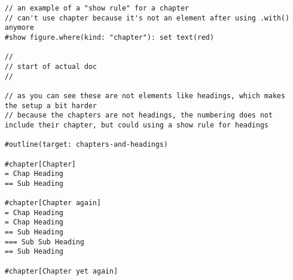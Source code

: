 \begin{verbatim}
// an example of a "show rule" for a chapter
// can't use chapter because it's not an element after using .with() anymore
#show figure.where(kind: "chapter"): set text(red)

//
// start of actual doc
//

// as you can see these are not elements like headings, which makes the setup a bit harder
// because the chapters are not headings, the numbering does not include their chapter, but could using a show rule for headings

#outline(target: chapters-and-headings)

#chapter[Chapter]
= Chap Heading
== Sub Heading

#chapter[Chapter again]
= Chap Heading
= Chap Heading
== Sub Heading
=== Sub Sub Heading
== Sub Heading

#chapter[Chapter yet again]
\end{verbatim}

\pandocbounded{}
